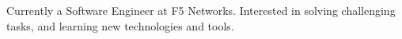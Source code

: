 

\begin{cvparagraph}

Currently a Software Engineer at F5 Networks.  Interested in solving challenging tasks, and learning new technologies and tools.
\end{cvparagraph}
